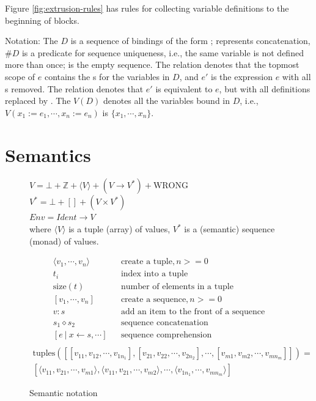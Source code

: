\documentclass[acmsmall,review,anonymous,dvipsnames]{acmart}\settopmatter{printfolios=true,printccs=false,printacmref=false}
\newcommand{\vtt}[1]{\text{\tt #1}}
\newcommand{\tuple}[1]{\langle #1 \rangle}
\newcommand{\Value}{V}
\newcommand{\Env}{Env}
\newcommand{\mcompr}[2]{[ #1 \:|\: #2 ]}
\newcommand{\mbind}[2]{ #1 \leftarrow #2 }
\newcommand{\malt}{\diamond}
\newcommand{\munit}[1]{[#1]}
\begin{document}
Figure \ref{fig:extrusion-rules} has rules for collecting variable definitions to the beginning of blocks.

Notation: The $D$ is a sequence of bindings of the form \vtt{$x$:=$e$};
 represents concatenation, $\#D$ is a predicate for sequence uniqueness, i.e., the same variable is not defined more than once;
 is the empty sequence.
The relation  denotes that the topmost scope of $e$ contains the
\vtt{def}s for the variables in $D$, and $e'$ is the expression $e$ with all \vtt{def}s removed.
The relation  denotes that $e'$ is equivalent to $e$,
but with all definitions replaced by \vtt{def-in}.
The $V(D)$ denotes all the variables bound in $D$, i.e., $V(x_1:=e_1,\cdots,x_n:=e_n)$ is $\{x_1,\cdots,x_n\}$.



\section{Semantics} \label{sec:semantics}


\begin{figure}
  $\Value = \bot + \mathbb{Z} + \tuple{\Value} + (\Value \rightarrow \Value^{*}) + \mathrm{WRONG}$ \\
  $\Value^{*} = \bot + [] + (\Value \times \Value^{*})$ \\
  $\Env = Ident \rightarrow \Value$ \\
  where $\tuple{\Value}$ is a tuple (array) of values, $\Value^{*}$ is a (semantic) sequence (monad) of values.

  \begin{align*}
    \tuple{v_1,\cdots,v_n} && \text{create a tuple,}\, n >= 0 \\
    t_i                    && \text{index into a tuple} \\
    \mathrm{size}(t)       && \text{number of elements in a tuple} \\
    \munit{v_1,\cdots,v_n} && \text{create a sequence,}\, n >= 0 \\
    v : s                 && \text{add an item to the front of a sequence} \\
    s_1 \malt s_2          && \text{sequence concatenation} \\
    \mcompr{e}{\mbind{x}{s}, \cdots} && \text{sequence comprehension} \\
  \end{align*}
  \begin{multline*}
    \mathrm{tuples}(\munit{
      \munit{v_{11},v_{12},\cdots,v_{1n_1}},
      \munit{v_{21},v_{22},\cdots,v_{2n_2}},
      \cdots,
      \munit{v_{m1},v_{m2},\cdots,v_{mn_m}}}) = \\
    \munit{
      \tuple{v_{11},v_{21},\cdots,v_{m1}},
      \tuple{v_{11},v_{21},\cdots,v_{m2}},
      \cdots,
      \tuple{v_{1n_1},\cdots,v_{mn_m}}}
  \end{multline*}

\caption{Semantic notation}
\label{semantic-notation}
\end{figure}
\end{document}
